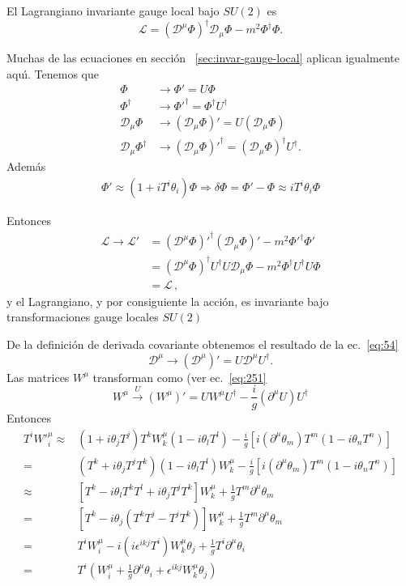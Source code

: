 El Lagrangiano invariante gauge local bajo $SU(2)$ es
\begin{equation}
  \label{eq:163}
  \mathcal{L}=\left(\mathcal{D}^\mu\Phi\right)^\dagger\mathcal{D}_\mu\Phi-m^2\Phi^\dagger \Phi.  
\end{equation}


Muchas de las ecuaciones en secci\'on ~\ref{sec:invar-gauge-local} aplican igualmente aqu\'\i.
Tenemos que
\begin{align}
  \Phi&\to\Phi'=U\Phi\nonumber\\
  \Phi^\dagger&\to{\Phi'}^\dagger =\Phi^\dagger U^\dagger\nonumber\\ 
  \mathcal{D}_\mu\Phi&\to(\mathcal{D}_\mu\Phi)'=U(\mathcal{D}_\mu\Phi)\nonumber\\
  \mathcal{D}_\mu\Phi^\dagger&\to{(\mathcal{D}_\mu\Phi)'}^\dagger =(\mathcal{D}_\mu\Phi)^\dagger U^\dagger.
\end{align}
Adem\'as
\begin{align}
  \label{eq:169}
  \Phi'\approx(1+iT^i\theta_i)\Phi\Rightarrow\delta\Phi=\Phi'-\Phi\approx iT^i\theta_i\Phi
\end{align}

Entonces
\begin{align}
   \mathcal{L}\to\mathcal{L}'&={\left(\mathcal{D}^\mu\Phi\right)'}^\dagger(\mathcal{D}_\mu\Phi)'-m^2{\Phi'}^\dagger \Phi'\nonumber\\  
   &=\left(\mathcal{D}^\mu\Phi\right)^\dagger U^\dagger U\mathcal{D}_\mu\Phi-m^2\Phi^\dagger U^\dagger U \Phi\nonumber\\
   &=\mathcal{L}\,,
\end{align}
y el Lagrangiano, y por consiguiente la acci\'on, es invariante bajo transformaciones gauge locales $SU(2)$

De la definici\'on de derivada covariante obtenemos el resultado de la ec.~\eqref{eq:54}
\begin{equation}
 \label{eq:69}
  \mathcal{D}^\mu\to\left(
    \mathcal{D}^\mu
  \right)'=U\mathcal{D}^\mu U^\dagger.
\end{equation}
Las matrices $W^\mu$ transforman como (ver ec.~\eqref{eq:251}
\begin{equation}
  W^\mu\overset{U}{\to}
  \left(W^\mu\right)'=UW^\mu U^\dagger -\frac{i}{g}(\partial^\mu U)U^\dagger 
\end{equation}
Entonces
\begin{align}
  T^i{W'}^\mu_i\approx&(1+i\theta_jT^j)T^kW^\mu_k(1-i\theta_lT^l)-\frac{i}{g}[i(\partial^\mu\theta_m)T^m(1-i\theta_nT^n)]\nonumber\\
  =&(T^k+i\theta_jT^jT^k)(1-i\theta_lT^l)W^\mu_k-\frac{i}{g}[i(\partial^\mu\theta_m)T^m(1-i\theta_nT^n)]\nonumber\\
  \approx&[T^k-i\theta_lT^kT^l+i\theta_jT^jT^k]W^\mu_k+\frac{1}{g}T^m\partial^\mu\theta_m\nonumber\\
  =&[T^k-i\theta_j(T^kT^j-T^jT^k)]W^\mu_k+\frac{1}{g}T^m\partial^\mu\theta_m\nonumber\\
  =&T^iW^\mu_i-i(i\epsilon^{ikj}T^i)W^\mu_k\theta_j+\frac{1}{g}T^i\partial^\mu\theta_i\nonumber\\
  =&T^i\left(W^\mu_i+\frac{1}{g}\partial^\mu\theta_i+\epsilon^{ikj}W^\mu_k\theta_j\right)
\end{align}

